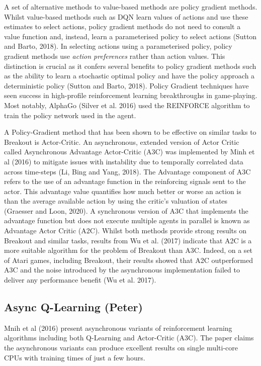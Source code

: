 \documentclass{article}
\begin{document}
A set of alternative methods to value-based methods are policy gradient methods. Whilst value-based methods such as DQN learn values of actions and use these estimates to select actions, policy gradient methods do not need to consult a value function and, instead, learn a parameterised policy to select actions (Sutton and Barto, 2018). In selecting actions using a parameterised policy, policy gradient methods use \emph{action preferences} rather than action values. This distinction is crucial as it confers several benefits to policy gradient methods such as the ability to learn a stochastic optimal policy and have the policy approach a deterministic policy (Sutton and Barto, 2018). Policy Gradient techniques have seen success in high-profile reinforcement learning breakthroughs in game-playing. Most notably, AlphaGo (Silver et al. 2016) used the REINFORCE algorithm to train the policy network used in the agent.

A Policy-Gradient method that has been shown to be effective on similar tasks to Breakout is Actor-Critic. An asynchronous, extended version of Actor Critic called Asynchronous Advantage Actor-Critic (A3C) was implemented by Minh et al (2016) to mitigate issues with instability due to temporally correlated data across time-steps (Li, Bing and Yang, 2018). The Advantage component of A3C refers to the use of an advantage function in the reinforcing signals sent to the actor. This advantage value quantifies how much better or worse an action is than the average available action by using the critic's valuation of states (Graesser and Loon, 2020). A synchronous version of A3C that implements the advantage function but does not execute multiple agents in parallel is known as Advantage Actor Critic (A2C). Whilst both methods provide strong results on Breakout and similar tasks, results from Wu et al. (2017) indicate that A2C is a more suitable algorithm for the problem of Breakout than A3C. Indeed, on a set of Atari games, including Breakout, their results showed that A2C outperformed A3C and the noise introduced by the asynchronous implementation failed to deliver any performance benefit (Wu et al. 2017).

\subsection{Async Q-Learning (Peter)}

Mnih et al (2016) present asynchronous variants of reinforcement learning algorithms including both Q-Learning and Actor-Critic (A3C).
The paper claims the asynchronous variants can produce excellent results on single multi-core CPUs with training times of just a few hours.
\end{document}
